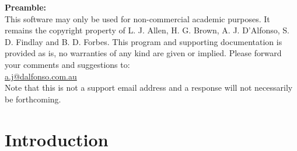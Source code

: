 \documentclass[12pt,a4paper]{article}
\begin{document}
\newpage

\tableofcontents










\vspace{5mm}

\newpage

{\bf Preamble:}\\
 
This software may only be used for non-commercial academic purposes. It remains the copyright property of L. J. Allen, H. G. Brown, A. J. D'Alfonso, S. D. Findlay and B. D. Forbes. This program and supporting documentation is provided as is, no warranties of any kind are given or implied.
Please forward your comments and suggestions to: \\

\href{mailto:a.j@dalfonso.com.au}{a.j@dalfonso.com.au} \\ 

\noindent Note that this is not a support email address and a response will not necessarily be forthcoming.\\


\newpage
 

\section{Introduction}
\end{document}
